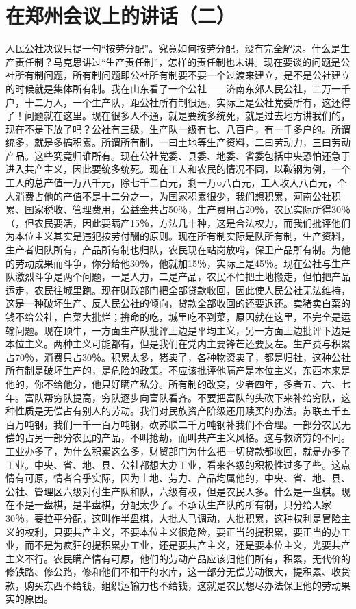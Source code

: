 \section[在郑州会议上的讲话（二）（一九五九年二月二十七日）]{在郑州会议上的讲话（二）}


人民公社决议只提一句“按劳分配”。究竟如何按劳分配，没有完全解决。什么是生产责任制？马克思讲过“生产责任制”，怎样的责任制也未讲。现在要谈的问题是公社所有制问题，所有制问题即公社所有制要不要一个过渡来建立，是不是公社建立的时候就是集体所有制。我在山东看了一个公社——济南东郊人民公社，二万一千户，十二万人，一个生产队，距公社所有制很远，实际上是公社党委所有，这还得了！问题就在这里。现在很多人不通，就是要统多统死，就是过去地方讲我们的，现在不是下放了吗？公社有三级，生产队一级有七、八百户，有一千多户的。所谓统多，就是多搞积累。所谓所有制，一曰土地等生产资料，二曰劳动力，三曰劳动产品。这些究竟归谁所有。现在公社党委、县委、地委、省委包括中央恐怕还急于进入共产主义，因此要统多统死。现在工人和农民的情况不同，以鞍钢为例，一个工人的总产值一万八千元，除七千二百元，剩一万○八百元，工人收入八百元，个人消费占他的产值不是十二分之一，为国家积累很少，我们想积累，河南公社积累、国家税收、管理费用，公益金共占50％，生产费用占20％，农民实际所得30％（，但农民要活，因此要瞒产15％，方法几十种，这是合法权力，而我们批评他们为本位主义其实是违犯按劳付酬的原则。现在所有制实际是队所有制，生产资料，生产者归队所有，产品所有制也归队，农民现在站岗放哨，保卫产品所有制。为他的劳动成果而斗争，你分给他30％，他就加15％，实际上是45％。现在公社与生产队激烈斗争是两个问题，一是人力，二是产品，农民不怕把土地搬走，但怕把产品运走，农民往城里跑。现在财政部门把全部贷款收回，因此使人民公社无法维持，这是一种破坏生产、反人民公社的倾向，贷款全部收回的还要退还。卖猪卖白菜的钱不给公社，白菜大批烂；拚命的吃，城里吃不到菜，原因就在这里，不完全是运输问题。现在顶牛，一方面生产队批评上边是平均主义，另一方面上边批评下边是本位主义。两种主义可能都有，但是我们在党内主要锋芒还要反左。生产费与积累占70％，消费只占30％。积累太多，猪卖了，各种物资卖了，都是归社，这种公社所有制是破坏生产的，是危险的政策。不应该批评他瞒产是本位主义，东西本来是他的，你不给他分，他只好瞒产私分。所有制的改变，少者四年，多者五、六、七年。富队帮穷队提高，穷队逐步向富队看齐。不要把富队的头砍下来补给穷队，这种性质是无偿占有别人的劳动。我们对民族资产阶级还用赎买的办法。苏联五千五百万吨钢，我们一千一百万吨钢，砍苏联二千万吨钢补我们不合理。一部分农民无偿的占另一部分农民的产品，不叫抢劫，而叫共产主义风格。这与救济穷的不同。工业办多了，为什么积累这么多，财贸部门为什么把一切贷款都收回，就是办多了工业。中央、省、地、县、公社都想大办工业，看来各级的积极性过多了些。这点情有可原，情者合乎实际，因为土地、劳力、产品均属他的，中央、省、地、县、公社、管理区六级对付生产队和队，六级有权，但是农民人多。什么是一盘棋。现在不是一盘棋，是半盘棋，分配太少了。不承认生产队的所有制，只分给人家30％，要拉平分配，这叫作半盘棋，大批人马调动，大批积累，这种权利是冒险主义的权利，只要共产主义，不要本位主义很危险，要正当的提积累，要正当的办工业，而不是为疯狂的提积累办工业，还是要共产主义，还是要本位主义，光要共产主义不行。农民瞒产情有可原，他们的劳动产品应该归他们所有，积累，无代价的修铁路、修公路，修和他们不相干的水库，这一部分无偿劳动很大，提积累、收贷款，购买东西不给钱，组织运输力也不给钱，这就是农民想尽办法保卫他的劳动果实的原因。

